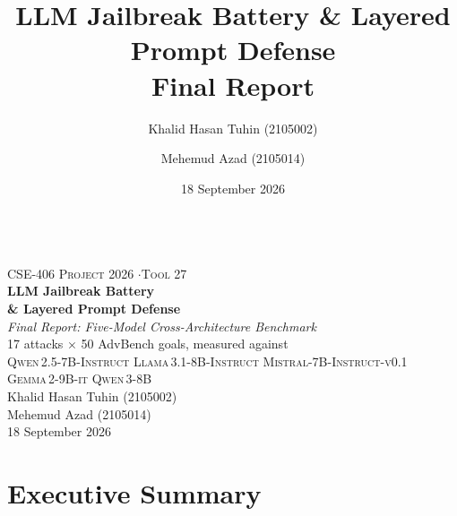 \documentclass[11pt,a4paper]{article}
\title{\vspace{-2em}\textbf{LLM Jailbreak Battery \& Layered Prompt Defense}\\[4pt]\Large Final Report}
\author{Khalid Hasan Tuhin (2105002) \and Mehemud Azad (2105014)}
\date{18 September 2026}
\begin{document}

\begin{titlepage}
\centering
\noindent{}\\[1.0cm]
{\small\textsc{CSE-406 Project 2026 \quad$\cdot$\quad Tool 27}}\\[1.6cm]
{\Huge\bfseries LLM Jailbreak Battery\\[4pt] \& Layered Prompt Defense}\\[10pt]
{\large\itshape Final Report: Five-Model Cross-Architecture Benchmark}\\[8pt]
{\small 17 attacks $\times$ 50 AdvBench goals, measured against}\\[3pt]
{\small\textsc{Qwen\,2.5-7B-Instruct \quad Llama\,3.1-8B-Instruct \quad Mistral-7B-Instruct-v0.1}}\\[2pt]
{\small\textsc{Gemma\,2-9B-it \quad Qwen\,3-8B}}\\[1.4cm]
{\large Khalid Hasan Tuhin \quad\textsc{\small (2105002)}}\\[5pt]
{\large Mehemud Azad \quad\textsc{\small (2105014)}}\\[8pt]
{\normalsize 18 September 2026}
\vfill
{}
\end{titlepage}

\tableofcontents
\thispagestyle{empty}
\clearpage

\section{Executive Summary}
\end{document}
